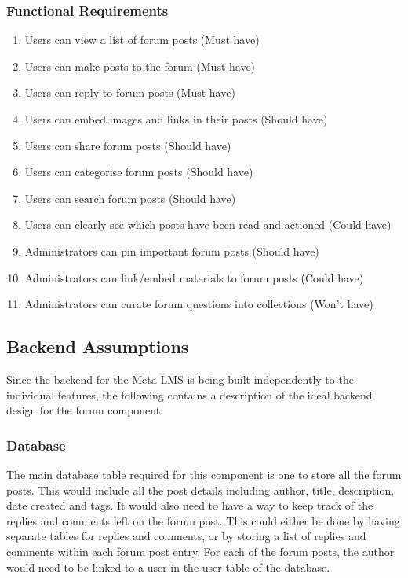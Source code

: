 \subsubsection{Functional Requirements}
\begin{enumerate}
    \item Users can view a list of forum posts (Must have)
    \item Users can make posts to the forum (Must have)
    \item Users can reply to forum posts (Must have)
    \item Users can embed images and links in their posts (Should have)
    \item Users can share forum posts (Should have)
    \item Users can categorise forum posts (Should have)
    \item Users can search forum posts (Should have)
    \item Users can clearly see which posts have been read and actioned (Could have)
    \item Administrators can pin important forum posts (Should have)
    \item Administrators can link/embed materials to forum posts (Could have)
    \item Administrators can curate forum questions into collections (Won't have)
\end{enumerate}

\newpage

\subsection{Backend Assumptions}
Since the backend for the Meta LMS is being built independently to the individual features, the following contains a description of the ideal backend design for the forum component.

\subsubsection{Database}
The main database table required for this component is one to store all the forum posts.
This would include all the post details including author, title, description, date created and tags.
It would also need to have a way to keep track of the replies and comments left on the forum post.
This could either be done by having separate tables for replies and comments, or by storing a list of replies and comments within each forum post entry.
For each of the forum posts, the author would need to be linked to a user in the user table of the database.

